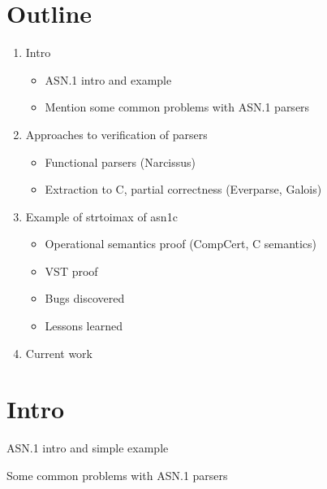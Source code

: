 \documentclass[12pt,usenames,dvipsnames]{paper}
\title{}
\subtitle{}
\date{\date{}}
\begin{document}
\maketitle

\section{Outline}

\begin{enumerate}

\item Intro
  \begin{itemize}
  \item ASN.1 intro and example 
  \item Mention some common problems with ASN.1 parsers
  \end{itemize}
\item Approaches to verification of parsers
  \begin{itemize}
  \item Functional parsers (Narcissus)
  \item Extraction to C, partial correctness (Everparse, Galois)
  \end{itemize}

  \item Example of strtoimax of asn1c
\begin{itemize}
  \item Operational semantics proof (CompCert, C semantics)
  \item VST proof 
    \item Bugs discovered
  \item Lessons learned
  \end{itemize}

\item Current work


\end{enumerate}

\section{Intro}
  ASN.1 intro and simple example 

  Some common problems with ASN.1 parsers
\end{document}

